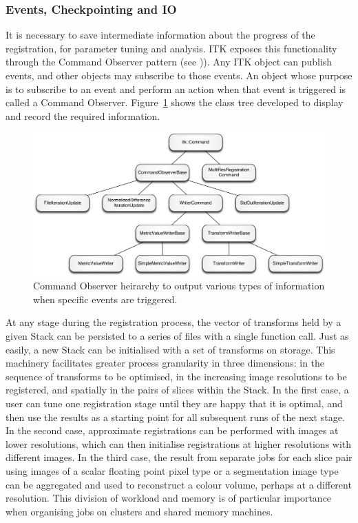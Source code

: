 		\subsubsection{Events, Checkpointing and IO} %
		\label{ssub:events_checkpointing_and_io}
			It is necessary to save intermediate information about the progress of the registration, for parameter tuning and analysis. ITK exposes this functionality through the Command Observer pattern (see \cite{Gamma1995})). Any ITK object can publish events, and other objects may subscribe to those events. An object whose purpose is to subscribe to an event and perform an action when that event is triggered is called a Command Observer. Figure~\ref{fig:command_heirarchy} shows the class tree developed to display and record the required information.
			
    \begin{figure}[htbp]
      \centering
      \includegraphics[width=\pagewidth]{Ch6/Figs/command_heirarchy}
      \caption{Command Observer heirarchy to output various types of information when specific events are triggered.}
      \label{fig:command_heirarchy}
    \end{figure}
		
      At any stage during the registration process, the vector of transforms held by a given Stack can be persisted to a series of files with a single function call. Just as easily, a new Stack can be initialised with a set of transforms on storage. This machinery facilitates greater process granularity in three dimensions: in the sequence of transforms to be optimised, in the increasing image resolutions to be registered, and spatially in the pairs of slices within the Stack. In the first case, a user can tune one registration stage until they are happy that it is optimal, and then use the results as a starting point for all subsequent runs of the next stage. In the second case, approximate registrations can be performed with images at lower resolutions, which can then initialise registrations at higher resolutions with different images. In the third case, the result from separate jobs for each slice pair using images of a scalar floating point pixel type or a segmentation image type can be aggregated and used to reconstruct a colour volume, perhaps at a different resolution. This division of workload and memory is of particular importance when organising jobs on clusters and shared memory machines.
			
